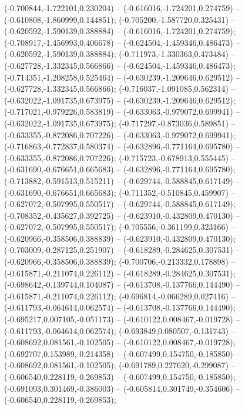  (-0.700844,-1.722101,0.230204) -- (-0.616016,-1.724201,0.274759) -- (-0.610808,-1.860999,0.144851);
 (-0.705200,-1.587720,0.325431) -- (-0.620592,-1.590139,0.388884) -- (-0.616016,-1.724201,0.274759);
 (-0.708917,-1.456993,0.406678) -- (-0.624504,-1.459346,0.486473) -- (-0.620592,-1.590139,0.388884);
 (-0.711973,-1.330363,0.473484) -- (-0.627728,-1.332345,0.566866) -- (-0.624504,-1.459346,0.486473);
 (-0.714351,-1.208258,0.525464) -- (-0.630239,-1.209646,0.629512) -- (-0.627728,-1.332345,0.566866);
 (-0.716037,-1.091085,0.562314) -- (-0.632022,-1.091735,0.673975) -- (-0.630239,-1.209646,0.629512);
 (-0.717021,-0.979226,0.583819) -- (-0.633063,-0.979072,0.699941) -- (-0.632022,-1.091735,0.673975);
 (-0.717297,-0.873036,0.589851) -- (-0.633355,-0.872086,0.707226) -- (-0.633063,-0.979072,0.699941);
 (-0.716863,-0.772837,0.580374) -- (-0.632896,-0.771164,0.695780) -- (-0.633355,-0.872086,0.707226);
 (-0.715723,-0.678913,0.555445) -- (-0.631690,-0.676651,0.665683) -- (-0.632896,-0.771164,0.695780);
 (-0.713882,-0.591513,0.515211) -- (-0.629744,-0.588845,0.617149) -- (-0.631690,-0.676651,0.665683);
 (-0.711352,-0.510845,0.459907) -- (-0.627072,-0.507995,0.550517) -- (-0.629744,-0.588845,0.617149);
 (-0.708352,-0.435627,0.392725) -- (-0.623910,-0.432809,0.470130) -- (-0.627072,-0.507995,0.550517);
 (-0.705556,-0.361199,0.323166) -- (-0.620966,-0.358506,0.388839) -- (-0.623910,-0.432809,0.470130);
 (-0.703009,-0.287125,0.251907) -- (-0.618289,-0.284625,0.307531) -- (-0.620966,-0.358506,0.388839);
 (-0.700706,-0.213332,0.178898) -- (-0.615871,-0.211074,0.226112) -- (-0.618289,-0.284625,0.307531);
 (-0.698642,-0.139744,0.104087) -- (-0.613708,-0.137766,0.144490) -- (-0.615871,-0.211074,0.226112);
 (-0.696814,-0.066289,0.027416) -- (-0.611793,-0.064614,0.062574) -- (-0.613708,-0.137766,0.144490);
 (-0.695217,0.007105,-0.051173) -- (-0.610122,0.008467,-0.019728) -- (-0.611793,-0.064614,0.062574);
 (-0.693849,0.080507,-0.131743) -- (-0.608692,0.081561,-0.102505) -- (-0.610122,0.008467,-0.019728);
 (-0.692707,0.153989,-0.214358) -- (-0.607499,0.154750,-0.185850) -- (-0.608692,0.081561,-0.102505);
 (-0.691789,0.227620,-0.299087) -- (-0.606540,0.228119,-0.269853) -- (-0.607499,0.154750,-0.185850);
 (-0.691093,0.301469,-0.386003) -- (-0.605814,0.301749,-0.354606) -- (-0.606540,0.228119,-0.269853);
